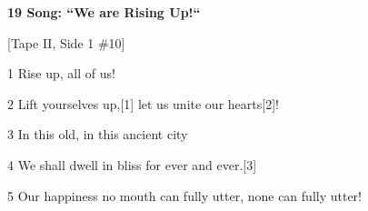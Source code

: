 
\textbf{19 Song: ``We are Rising Up!``}

[Tape II, Side 1 \#10]

1 Rise up, all of us!

2 Lift yourselves up,[1] let us unite our hearts[2]!

3 In this old, in this ancient city

4 We shall dwell in bliss for ever and ever.[3]

5 Our happiness no mouth can fully utter, none can fully utter!

